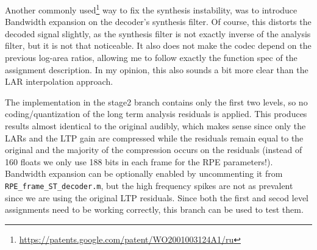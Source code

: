 \documentclass[]{article}
\begin{document}
Another commonly used\footnote{\url{https://patents.google.com/patent/WO2001003124A1/ru}} way to fix the synthesis instability, was to introduce Bandwidth expansion\cite{50066} on the decoder's synthesis filter. Of course, this distorts the decoded signal slightly, as the synthesis filter is not exactly inverse of the analysis filter, but it is not that noticeable. It also does not make the codec depend on the previous log-area ratios, allowing me to follow exactly the function spec of the assignment description. In my opinion, this also sounds a bit more clear than the LAR interpolation approach.

The implementation in the stage2 branch contains only the first two levels, so no coding/quantization of the long term analysis residuals is applied. This produces results almost identical to the original audibly, which makes sense since only the LARs and the LTP gain are compressed while the residuals remain equal to the original and the majority of the compression occurs on the residuals (instead of 160 floats we only use 188 bits in each frame for the RPE parameters!). Bandwidth expansion can be optionally enabled by uncommenting it from \texttt{RPE\_frame\_ST\_decoder.m}, but the high frequency spikes are not as prevalent since we are using the original LTP residuals. Since both the first and secod level assignments need to be working correctly, this branch can be used to test them.

\printbibliography
\end{document}
